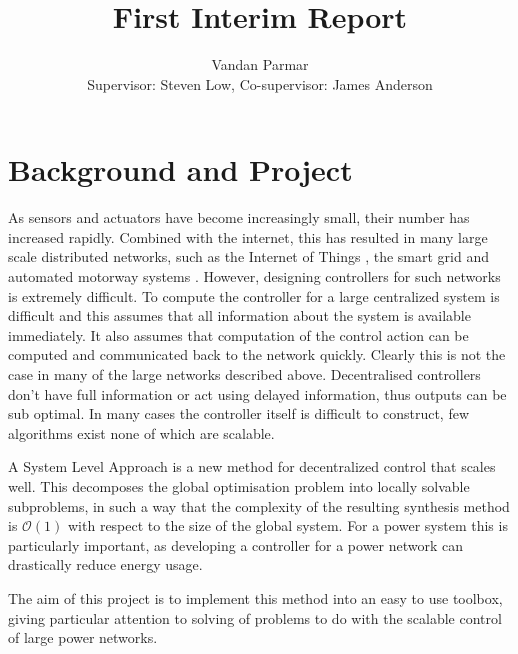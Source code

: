 \documentclass[11pt,a4paper]{article}
\begin{document}
\title{First Interim Report}
\author{Vandan Parmar \\
Supervisor: Steven Low, Co-supervisor: James Anderson}
\maketitle
\section*{Background and Project}
As sensors and actuators have become increasingly small, their number has increased rapidly. Combined with the internet, this has resulted in many large scale distributed networks, such as the Internet of Things \cite{Atzori2010}, the smart grid \cite{Amin2005,Farhangi2010} and automated motorway systems \cite{Chien1997}. However, designing controllers for such networks is extremely difficult. To compute the controller for a large centralized system is difficult and this assumes that all information about the system is available immediately. It also assumes that computation of the control action can be computed and communicated back to the network quickly. Clearly this is not the case in many of the large networks described above. Decentralised controllers don't have full information or act using delayed information, thus outputs can be sub optimal. In many cases the controller itself is difficult to construct, few algorithms exist none of which are scalable.

A System Level Approach \cite{Wang2017} is a new method for decentralized control that scales well. This decomposes the global optimisation problem into locally solvable subproblems, in such a way that the complexity of the resulting synthesis method is $\mathcal{O}(1)$ with respect to the size of the global system. For a power system this is particularly important, as developing a controller for a power network can drastically reduce energy usage. 

The aim of this project is to implement this method into an easy to use toolbox, giving particular attention to solving of problems to do with the scalable control of large power networks.
\end{document}
